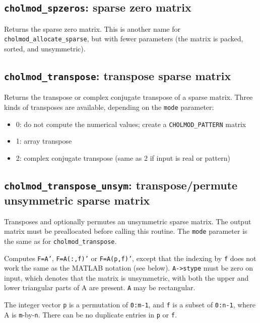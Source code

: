 \documentclass[11pt]{article}
\begin{document}
\subsection{{\tt cholmod\_spzeros}: sparse zero matrix}


Returns the sparse zero matrix.  This is another name
for {\tt cholmod\_allocate\_sparse}, but with fewer parameters
(the matrix is packed, sorted, and unsymmetric).

\subsection{{\tt cholmod\_transpose}: transpose sparse matrix}


Returns the transpose or complex conjugate transpose of a sparse matrix.
Three kinds of transposes are available, depending on the {\tt mode}
parameter:

\begin{itemize}
\item    0: do not compute the numerical values; create a
                {\tt CHOLMOD\_PATTERN} matrix
\item    1: array transpose
\item    2: complex conjugate transpose (same as 2 if input is real or pattern)
\end{itemize}

\subsection{{\tt cholmod\_transpose\_unsym}: transpose/permute unsymmetric
sparse matrix}


Transposes and optionally permutes an unsymmetric sparse matrix.  The output
matrix must be preallocated before calling this routine.
The \verb'mode' parameter is the same as for \verb'cholmod_transpose'.

Computes {\tt F=A'}, {\tt F=A(:,f)'} or {\tt F=A(p,f)'}, except that the
indexing by {\tt f} does not work the same as the MATLAB notation (see below).
{\tt A->stype} must be zero on input, which denotes that the matrix is
unsymmetric, with both the upper and lower triangular parts of A are present.
{\tt A} may be rectangular.

The integer vector {\tt p} is a permutation of {\tt 0:m-1}, and {\tt f} is a
subset of {\tt 0:n-1}, where A is {\tt m}-by-{\tt n}.  There can be no
duplicate entries in {\tt p} or {\tt f}.
\end{document}
